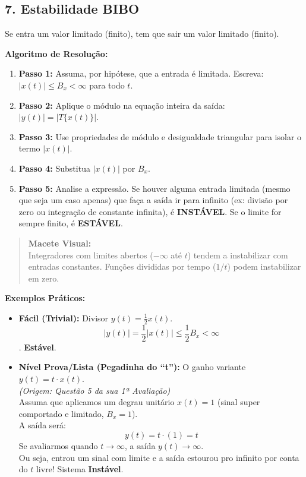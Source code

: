\subsection{7. Estabilidade BIBO}\label{estabilidade-bibo}

Se entra um valor limitado (finito), tem que sair um valor limitado (finito).

\textbf{Algoritmo de Resolução:}

\begin{enumerate}
\def\labelenumi{\arabic{enumi}.}
\tightlist
\item
  \textbf{Passo 1:} Assuma, por hipótese, que a entrada é limitada. Escreva: \(|x(t)| \le B_x < \infty\) para todo \(t\).
\item
  \textbf{Passo 2:} Aplique o módulo na equação inteira da saída: \(|y(t)| = |T\{x(t)\}|\).
\item
  \textbf{Passo 3:} Use propriedades de módulo e desigualdade triangular para isolar o termo \(|x(t)|\).
\item
  \textbf{Passo 4:} Substitua \(|x(t)|\) por \(B_x\).
\item
  \textbf{Passo 5:} Analise a expressão. Se houver alguma entrada limitada (mesmo que seja um caso apenas) que faça a saída ir para infinito (ex: divisão por zero ou integração de constante infinita), é \textbf{INSTÁVEL}. Se o limite for sempre finito, é \textbf{ESTÁVEL}.
\end{enumerate}

\begin{quote}
\textbf{Macete Visual:}\\
Integradores com limites abertos (\(-\infty\) até \(t\)) tendem a instabilizar com entradas constantes. Funções divididas por tempo (\(1/t\)) podem instabilizar em zero.
\end{quote}

\textbf{Exemplos Práticos:}

\begin{itemize}
\item
  \textbf{Fácil (Trivial):} Divisor \(y(t) = \frac{1}{2} x(t)\).
  \[|y(t)| = \frac{1}{2}|x(t)| \le \frac{1}{2} B_x < \infty\]. \textbf{Estável}.
\item
  \textbf{Nível Prova/Lista (Pegadinha do ``t''):} O ganho variante \(y(t) = t \cdot x(t)\).\\
  \emph{(Origem: Questão 5 da sua 1ª Avaliação)}\\
  Assuma que aplicamos um degrau unitário \(x(t) = 1\) (sinal super comportado e limitado, \(B_x=1\)).\\
  A saída será:
  \[y(t) = t \cdot (1) = t\]
  Se avaliarmos quando \(t \to \infty\), a saída \(y(t) \to \infty\).\\
  Ou seja, entrou um sinal com limite e a saída estourou pro infinito por conta do \(t\) livre! Sistema \textbf{Instável}.
\end{itemize}
